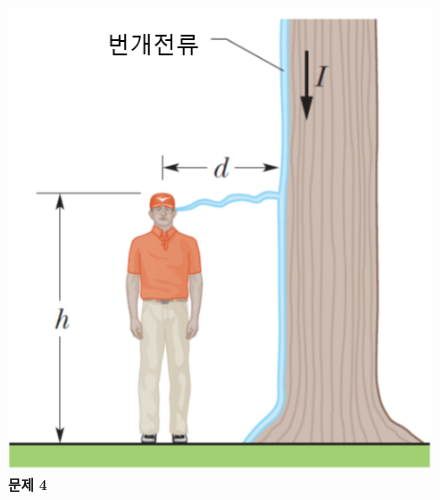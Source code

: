\documentclass[tightenlines,floatfix,nofootinbib,superscriptaddress,fleqn]{revtex4}
\begin{document}
\begin{figure}[htp]
  \centering
  \includegraphics[scale=0.45]{qfig5-20220914-1.png}
  \caption{\textbf{문제 4}}
  \label{fig:1}
\end{figure}

\vspace{1.cm}
\end{document}
